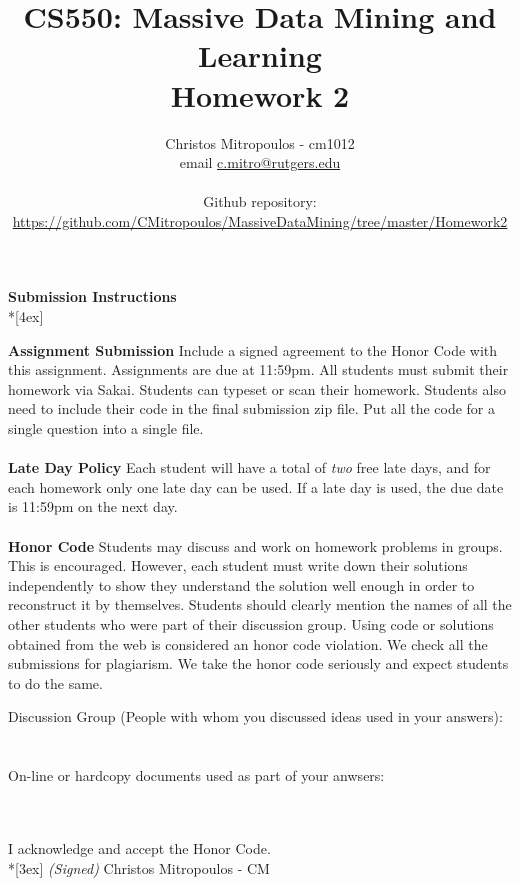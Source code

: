 \documentclass[11pt]{article}
\title{\LARGE{\bf \textsf{CS550: Massive Data Mining and Learning}}\\ {\bf \textsf{Homework 2}}}
\author{Christos Mitropoulos - cm1012 \\ email \href{mailto:c.mitro@rutgers.edu}{c.mitro@rutgers.edu} \\\\ Github repository:\\ \href{https://github.com/CMitropoulos/MassiveDataMining/tree/master/Homework2}{https://github.com/CMitropoulos/MassiveDataMining/tree/master/Homework2}}
\date{}
\begin{document}
\begin{titlepage}
\maketitle
\end{titlepage}

\pagebreak[4]
\begin{center}
\LARGE{\bf \textsf{Submission Instructions}} \\*[4ex]
\end{center}

\textbf{Assignment Submission } Include a signed agreement to the Honor Code with this assignment. Assignments are due at 11:59pm. All students must submit their homework via Sakai. Students can typeset or scan their homework. Students also need to include their code in the final submission zip file. Put all the code for a single question into a single file. 
\\
\\
\textbf{Late Day Policy } Each student will have a total of {\em two} free late days, and for each homework only one late day can be used. If a late day is used, the due date is 11:59pm on the next day.
\\
\\
\textbf{Honor Code } Students may discuss and work on homework problems in groups. This is encouraged. However, each student must write down their solutions independently to show they understand the solution well enough in order to reconstruct it by themselves.  Students should clearly mention the names of all the other students who were part of their discussion group. Using code or solutions obtained from the web is considered an honor code violation. We check all the submissions for plagiarism. We take the honor code seriously and expect students to do the same. 

\vfill
\vfill

Discussion Group (People with whom you discussed ideas used in your answers): \\\\\\
On-line or hardcopy documents used as part of your anwsers: \\\\\\
\vfill

\vfill

I acknowledge and accept the Honor Code.\\*[3ex]
\bigskip
\textit{(Signed)} Christos Mitropoulos - CM
\end{document}
